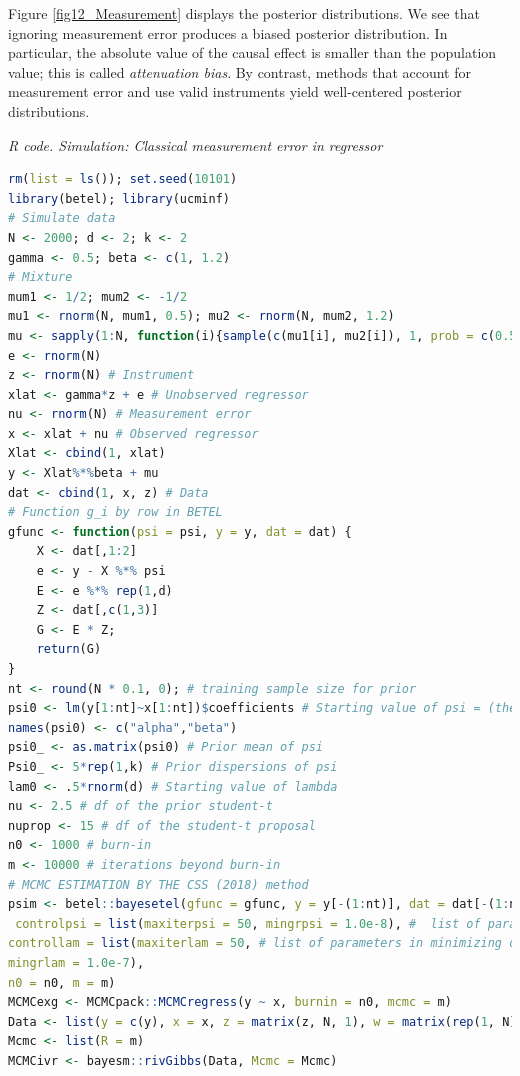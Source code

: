 Figure \ref{fig12_Measurement} displays the posterior distributions. We see that ignoring measurement error produces a biased posterior distribution. In particular, the absolute value of the causal effect is smaller than the population value; this is called \textit{attenuation bias}. By contrast, methods that account for measurement error and use valid instruments yield well-centered posterior distributions.

\begin{tcolorbox}[enhanced,width=4.67in,center upper,
	fontupper=\large\bfseries,drop shadow southwest,sharp corners]
	\textit{R code. Simulation: Classical measurement error in regressor}
	\begin{VF}
		\begin{lstlisting}[language=R]	
rm(list = ls()); set.seed(10101)
library(betel); library(ucminf)
# Simulate data
N <- 2000; d <- 2; k <- 2
gamma <- 0.5; beta <- c(1, 1.2)
# Mixture
mum1 <- 1/2; mum2 <- -1/2
mu1 <- rnorm(N, mum1, 0.5); mu2 <- rnorm(N, mum2, 1.2)
mu <- sapply(1:N, function(i){sample(c(mu1[i], mu2[i]), 1, prob = c(0.5, 0.5))})
e <- rnorm(N)
z <- rnorm(N) # Instrument
xlat <- gamma*z + e # Unobserved regressor
nu <- rnorm(N) # Measurement error
x <- xlat + nu # Observed regressor
Xlat <- cbind(1, xlat)
y <- Xlat%*%beta + mu
dat <- cbind(1, x, z) # Data
# Function g_i by row in BETEL
gfunc <- function(psi = psi, y = y, dat = dat) {
	X <- dat[,1:2]
	e <- y - X %*% psi
	E <- e %*% rep(1,d)
	Z <- dat[,c(1,3)]
	G <- E * Z;
	return(G)
}
nt <- round(N * 0.1, 0); # training sample size for prior
psi0 <- lm(y[1:nt]~x[1:nt])$coefficients # Starting value of psi = (theta, v), v is the slack parameter in CSS (2018)
names(psi0) <- c("alpha","beta")
psi0_ <- as.matrix(psi0) # Prior mean of psi 
Psi0_ <- 5*rep(1,k) # Prior dispersions of psi
lam0 <- .5*rnorm(d) # Starting value of lambda
nu <- 2.5 # df of the prior student-t
nuprop <- 15 # df of the student-t proposal
n0 <- 1000 # burn-in
m <- 10000 # iterations beyond burn-in
# MCMC ESTIMATION BY THE CSS (2018) method
psim <- betel::bayesetel(gfunc = gfunc, y = y[-(1:nt)], dat = dat[-(1:nt),], psi0 = psi0, lam0 = lam0, psi0_ = psi0_, Psi0_ = Psi0_, nu = nu, nuprop = nuprop,
 controlpsi = list(maxiterpsi = 50, mingrpsi = 1.0e-8), #  list of parameters in maximizing likelihood over psi
controllam = list(maxiterlam = 50, # list of parameters in minimizing dual over lambda
mingrlam = 1.0e-7),
n0 = n0, m = m)
MCMCexg <- MCMCpack::MCMCregress(y ~ x, burnin = n0, mcmc = m)
Data <- list(y = c(y), x = x, z = matrix(z, N, 1), w = matrix(rep(1, N), N, 1))
Mcmc <- list(R = m)
MCMCivr <- bayesm::rivGibbs(Data, Mcmc = Mcmc)
\end{lstlisting}
	\end{VF}
\end{tcolorbox} 

